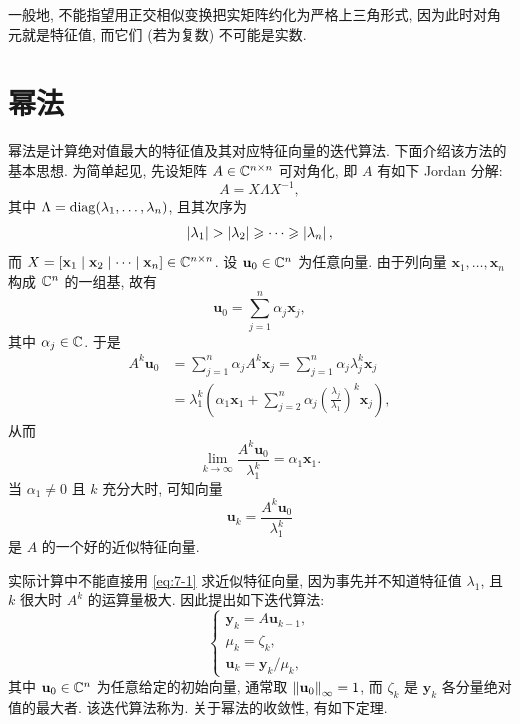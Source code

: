 一般地, 不能指望用正交相似变换把实矩阵约化为严格上三角形式, 因为此时对角元就是特征值, 而它们 (若为复数) 不可能是实数.

\section{幂法}
\label{sec:7-2}

幂法是计算绝对值最大的特征值及其对应特征向量的迭代算法. 下面介绍该方法的基本思想. 为简单起见, 先设矩阵 $A\in\mathbb{C}^{n\times n}$ 可对角化, 即 $A$ 有如下 Jordan 分解:
\[
  A=X\Lambda X^{-1},
\]
其中 $\Lambda=\operatorname{diag}(\lambda_1,\ldots,\lambda_n)$, 且其次序为
\[
  \abs{\lambda_1}>\abs{\lambda_2}\geqslant\cdots\geqslant\abs{\lambda_n},
\]
而 $X=[\mathbf{x}_1\mid\mathbf{x}_2\mid\cdots\mid\mathbf{x}_n]\in\mathbb{C}^{n\times n}$. 设 $\mathbf{u}_0\in\mathbb{C}^n$ 为任意向量. 由于列向量 $\mathbf{x}_1,\ldots,\mathbf{x}_n$ 构成 $\mathbb{C}^n$ 的一组基, 故有
\[
  \mathbf{u}_0=\sum_{j=1}^{n}\alpha_j\mathbf{x}_j,
\]
其中 $\alpha_j\in\mathbb{C}$. 于是
\[
  \begin{aligned}
    A^k\mathbf{u}_0
    &=\sum_{j=1}^{n}\alpha_jA^k\mathbf{x}_j
     =\sum_{j=1}^{n}\alpha_j\lambda_j^k\mathbf{x}_j\\
    &=\lambda_1^k\left(\alpha_1\mathbf{x}_1
      +\sum_{j=2}^{n}\alpha_j\left(\frac{\lambda_j}{\lambda_1}\right)^k\mathbf{x}_j\right),
  \end{aligned}
\]
从而
\[
  \lim_{k\rightarrow\infty}\frac{A^k\mathbf{u}_0}{\lambda_1^k}=\alpha_1\mathbf{x}_1.
\]
当 $\alpha_1\neq0$ 且 $k$ 充分大时, 可知向量
\begin{equation}
  \mathbf{u}_k=\frac{A^k\mathbf{u}_0}{\lambda_1^k}
  \label{eq:7-1}
\end{equation}
是 $A$ 的一个好的近似特征向量.

实际计算中不能直接用 \eqref{eq:7-1} 求近似特征向量, 因为事先并不知道特征值 $\lambda_1$, 且 $k$ 很大时 $A^k$ 的运算量极大. 因此提出如下迭代算法:
\begin{equation}
  \left\{
  \begin{array}{l}
    \mathbf{y}_k=A\mathbf{u}_{k-1},\\
    \mu_k=\zeta_k,\\
    \mathbf{u}_k=\mathbf{y}_k/\mu_k,
  \end{array}
  \right.
  \label{eq:7-2}
\end{equation}
其中 $\mathbf{u}_0\in\mathbb{C}^n$ 为任意给定的初始向量, 通常取 $\left\|\mathbf{u}_0\right\|_\infty=1$, 而 $\zeta_k$ 是 $\mathbf{y}_k$ 各分量绝对值的最大者. 该迭代算法称为. 关于幂法的收敛性, 有如下定理.

